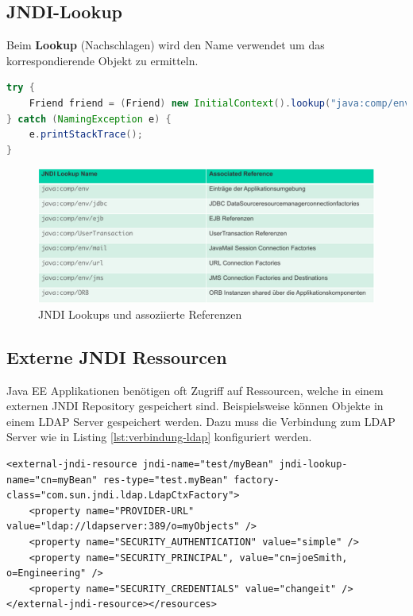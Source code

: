 \subsection{JNDI-Lookup}
Beim \textbf{Lookup} (Nachschlagen) wird den Name verwendet um das korrespondierende Objekt zu ermitteln. 

\begin{lstlisting}[language=Java, caption=Beispiel programmatischer EJB-Lookup]
try {
	Friend friend = (Friend) new InitialContext().lookup("java:comp/env/myFriend");
} catch (NamingException e) {
	e.printStackTrace();
}
\end{lstlisting}

\begin{figure}[h!]
\centering
\includegraphics[width=0.7\linewidth]{fig/jndi-lookups}
\caption{JNDI Lookups und assoziierte Referenzen}
\label{fig:jndi-lookups}
\end{figure}

\subsection{Externe JNDI Ressourcen}
Java EE Applikationen benötigen oft Zugriff auf Ressourcen, welche in einem externen JNDI Repository gespeichert sind. Beispielsweise können Objekte in einem LDAP Server gespeichert werden. Dazu muss die Verbindung zum LDAP Server wie in Listing \ref{lst:verbindung-ldap} konfiguriert werden.

\begin{lstlisting}[caption=Verbindung zum LDAP, label=lst:verbindung-ldap]
<external-jndi-resource jndi-name="test/myBean" jndi-lookup-name="cn=myBean" res-type="test.myBean" factory-class="com.sun.jndi.ldap.LdapCtxFactory">
	<property name="PROVIDER-URL" value="ldap://ldapserver:389/o=myObjects" />
	<property name="SECURITY_AUTHENTICATION" value="simple" />
	<property name="SECURITY_PRINCIPAL", value="cn=joeSmith, o=Engineering" />
	<property name="SECURITY_CREDENTIALS" value="changeit" />
</external-jndi-resource></resources>
\end{lstlisting}

